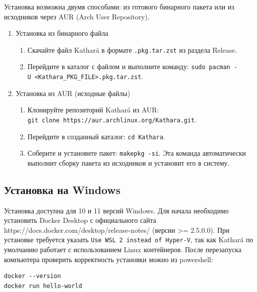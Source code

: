 \documentclass[
  english,
  russian,
  12pt,
  a4paper,
]{phdthesr}
\providecommand{\tightlist}{%
  \setlength{\itemsep}{0pt}\setlength{\parskip}{0pt}}
\begin{document}
Установка возможна двумя способами: из готового бинарного пакета или из
исходников через AUR (Arch User Repository).

\begin{enumerate}
\def\labelenumi{\arabic{enumi}.}
\tightlist
\item
  Установка из бинарного файла

  \begin{enumerate}
  \def\labelenumii{\arabic{enumii}.}
  \tightlist
  \item
    Скачайте файл Kathará в формате \texttt{.pkg.tar.zst} из раздела
    Release.
  \item
    Перейдите в каталог с файлом и выполните команду:
    \texttt{sudo\ pacman\ -U\ \textless{}Kathara\_PKG\_FILE\textgreater{}.pkg.tar.zst}.
  \end{enumerate}
\item
  Установка из AUR (исходные файлы)

  \begin{enumerate}
  \def\labelenumii{\arabic{enumii}.}
  \tightlist
  \item
    Клонируйте репозиторий Kathará из AUR:
    \texttt{git\ clone\ https://aur.archlinux.org/Kathara.git}.
  \item
    Перейдите в созданный каталог: \texttt{cd\ Kathara}.
  \item
    Соберите и установите пакет: \texttt{makepkg\ -si}. Эта команда
    автоматически выполнит сборку пакета из исходников и установит его в
    систему.
  \end{enumerate}
\end{enumerate}

\subsection{Установка на
Windows}\label{ux443ux441ux442ux430ux43dux43eux432ux43aux430-ux43dux430-windows}

Установка доступна для 10 и 11 версий Windows. Для начала необходимо
установить Docker Desktop с официального сайта
https://docs.docker.com/desktop/release-notes/ (версии \textgreater=
2.5.0.0). При установке требуется указать
\texttt{Use\ WSL\ 2\ instead\ of\ Hyper-V}, так как Kathará по умолчанию
работает с использованием Linux контейнеров. После перезапуска
компьютера проверить корректность установки можно из powershell:

\begin{verbatim}
docker --version
docker run hello-world
\end{verbatim}
\end{document}
